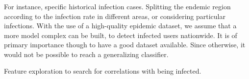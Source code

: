 \begin{description}
    \item [Search for epidemiological data at a detailed level.] For instance, specific historical infection cases.
    Splitting the endemic region according to the infection rate in different areas, or considering particular infections.
    With the use of a high-quality epidemic dataset, we assume that a more model complex can be built, to detect infected users nationwide.
    It is of primary importance though to have a good dataset available.
    Since otherwise, it would not be possible to reach a generalizing classifier.

    \item Feature exploration to search for correlations with being infected.

\end{description}


